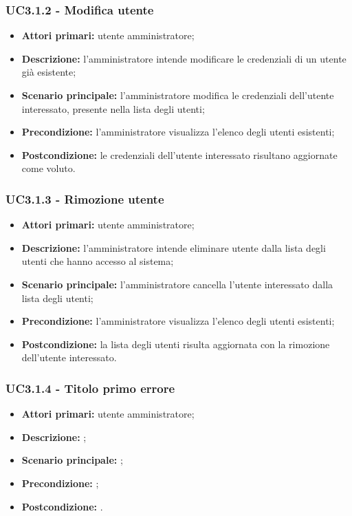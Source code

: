 \subsubsection{UC3.1.2 - Modifica utente}
\begin{itemize}
	\item \textbf{Attori primari:} utente amministratore;
	\item \textbf{Descrizione:} l'amministratore intende modificare le credenziali di un utente già esistente;
	\item \textbf{Scenario principale:} l'amministratore modifica le credenziali dell'utente interessato, presente nella lista degli utenti;
	\item \textbf{Precondizione:} l'amministratore visualizza l'elenco degli utenti esistenti;
	\item \textbf{Postcondizione:} le credenziali dell'utente interessato risultano aggiornate come voluto.
\end{itemize}

\subsubsection{UC3.1.3 - Rimozione utente}
\begin{itemize}
	\item \textbf{Attori primari:} utente amministratore;
	\item \textbf{Descrizione:} l'amministratore intende eliminare utente dalla lista degli utenti che hanno accesso al sistema;
	\item \textbf{Scenario principale:} l'amministratore cancella l'utente interessato dalla lista degli utenti;
	\item \textbf{Precondizione:} l'amministratore visualizza l'elenco degli utenti esistenti;
	\item \textbf{Postcondizione:} la lista degli utenti risulta aggiornata con la rimozione dell'utente interessato.
\end{itemize}

\subsubsection{UC3.1.4 - Titolo primo errore}
\begin{itemize}
	\item \textbf{Attori primari:} utente amministratore;
	\item \textbf{Descrizione:} ;
	\item \textbf{Scenario principale:} ;
	\item \textbf{Precondizione:} ;
	\item \textbf{Postcondizione:} .
\end{itemize}

